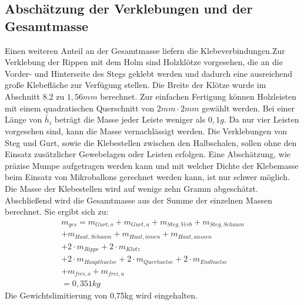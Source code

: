 \subsection{Abschätzung der Verklebungen und der Gesamtmasse}
Einen weiteren Anteil an der Gesamtmasse liefern die Klebeverbindungen.Zur Verklebung der Rippen mit dem Holm sind Holzklötze vorgesehen, die an die Vorder- und Hinterseite des Stegs geklebt werden und dadurch eine ausreichend große Klebefläche zur Verfügung stellen. Die Breite der Klötze wurde im Abschnitt 8.2 zu $ 1,56mm $ berechnet. Zur einfachen Fertigung können Holzleisten mit einem quadratischen Querschnitt von $ 2mm\cdot2mm $ gewählt werden. Bei einer Länge von $ \tilde{h_{i}} $ beträgt die Masse jeder Leiste weniger als $ 0,1g $. Da nur vier Leisten vorgesehen sind, kann die Masse vernachlässigt werden. Die Verklebungen von Steg und Gurt, sowie die Klebestellen zwischen den Halbschalen, sollen ohne den Einsatz zusätzlicher Gewebelagen oder Leisten erfolgen. Eine Abschätzung, wie präzise Mumpe aufgetragen werden kann und mit welcher Dichte der Klebemasse beim Einsatz von Mikroballons gerechnet werden kann, ist nur schwer möglich. Die Masse der Klebestellen wird auf wenige zehn Gramm abgeschätzt.\\

\noindent Abschließend wird die Gesamtmasse aus der Summe der einzelnen Massen berechnet. Sie ergibt sich zu:
\begin{equation}
\begin{array}{l}
	m_{ges}= m_{Gurt,o}+m_{Gurt,u}+m_{Steg,Verb}+m_{Steg,Schaum} \\ +m_{Haut,Schaum}+m_{Haut,innen}+m_{Haut,aussen} \\ +2\cdot m_{Rippe}+2\cdot m_{Klotz} \\
	+2\cdot m_{Haupthuelse}+2\cdot m_{Querhuelse}+2\cdot m_{Endhuelse}\\
	+m_{frei,o}+m_{frei,u}\\
	=0,351kg
\end{array}  
\end{equation}
Die Gewichtslimitierung von 0,75kg wird eingehalten.

